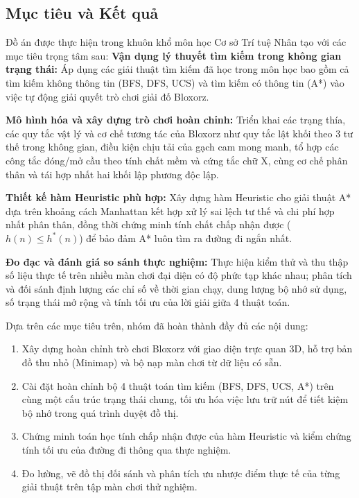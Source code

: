 \subsection{Mục tiêu và Kết quả}
Đồ án được thực hiện trong khuôn khổ môn học Cơ sở Trí tuệ Nhân tạo
với các mục tiêu trọng tâm sau:
\textbf{Vận dụng lý thuyết tìm kiếm trong không gian trạng thái:}
Áp dụng các giải thuật tìm kiếm đã học trong môn học  bao gồm cả
tìm kiếm không thông tin (BFS, DFS, UCS) và tìm kiếm có thông tin
(A*)  vào việc tự động giải quyết trò chơi giải đố Bloxorz.

\textbf{Mô hình hóa và xây dựng trò chơi hoàn chỉnh:}
Triển khai các trạng thía, các quy tắc vật lý và cơ chế tương tác 
của Bloxorz như quy tắc lật khối theo 3 tư thế trong không gian, điều kiện chịu
tải của gạch cam mong manh, tổ hợp các công tắc đóng/mở cầu theo tính chất mềm
và cứng tắc chữ X, cùng cơ chế phân thân và tái hợp nhất hai khối lập
phương độc lập. 

\textbf{Thiết kế hàm Heuristic phù hợp:}
Xây dựng hàm Heuristic cho giải thuật A* dựa trên khoảng cách Manhattan
kết hợp xử lý sai lệch tư thế và chi phí hợp nhất phân thân, đồng thời
chứng minh tính chất chấp nhận được ($h(n) \le h^*(n)$) để bảo đảm A*
luôn tìm ra đường đi ngắn nhất.

\textbf{Đo đạc và đánh giá so sánh thực nghiệm:}
Thực hiện kiểm thử và thu thập số liệu thực tế trên nhiều màn chơi
đại diện có độ phức tạp khác nhau; phân tích và đối sánh định lượng các
chỉ số về thời gian chạy, dung lượng bộ nhớ sử dụng, số trạng thái mở rộng
và tính tối ưu của lời giải giữa 4 thuật toán.

Dựa trên các mục tiêu trên, nhóm đã hoàn thành đầy đủ các nội dung:
\begin{enumerate}[1.]
    \item Xây dựng hoàn chỉnh trò chơi Bloxorz với giao diện trực quan 3D,
    hỗ trợ bản đồ thu nhỏ (Minimap) và bộ nạp màn chơi từ dữ liệu có sẵn.
    \item Cài đặt hoàn chỉnh bộ 4 thuật toán tìm kiếm (BFS, DFS, UCS, A*)
    trên cùng một cấu trúc trạng thái chung, tối ưu hóa việc lưu trữ nút
    để tiết kiệm bộ nhớ trong quá trình duyệt đồ thị.
    \item Chứng minh toán học tính chấp nhận được của hàm Heuristic và kiểm
    chứng tính tối ưu của đường đi thông qua thực nghiệm.
    \item Đo lường, vẽ đồ thị đối sánh và phân tích ưu nhược điểm thực tế
    của từng giải thuật trên tập màn chơi thử nghiệm.
\end{enumerate}
